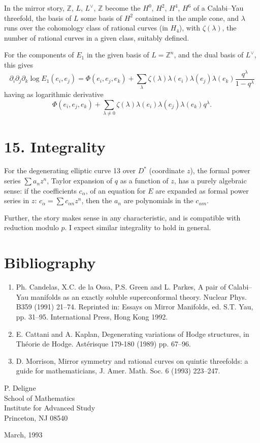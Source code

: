 \documentclass[11pt,a4paper]{article}
\theoremstyle{plain}
\theoremstyle{definition}
\begin{document}
In the mirror story, $\mathbb{Z}$, $L$, $L^{\vee}$, $\mathbb{Z}$ become the $H^{0}$, $H^{2}$, $H^{4}$, $H^{6}$ of a Calabi--Yau threefold, the basis of $L$ some basis of $H^{2}$ contained in the ample cone, and $\lambda$ runs over the cohomology class of rational curves (in $H_{4}$), with $\zeta(\lambda)$, the number of rational curves in a given class, suitably defined.

For the components of $E_{1}$ in the given basis of $L = \mathbb{Z}^{n}$, and the dual basis of $L^{\vee}$, this gives
\[
\partial_{i} \partial_{j} \partial_{k} \log E_{1}(e_{i}, e_{j}) = \Phi(e_{i}, e_{j}, e_{k}) + \sum_{\lambda} \zeta(\lambda) \lambda(e_{i}) \lambda(e_{j}) \lambda(e_{k}) \frac{q^{\lambda}}{1 - q^{\lambda}}
\]
having as logarithmic derivative
\[
\Phi(e_{i}, e_{j}, e_{k}) + \sum_{\lambda \neq 0} \zeta(\lambda) \lambda(e_{i}) \lambda(e_{j}) \lambda(e_{k}) q^{\lambda}.
\]

\section{15. Integrality}

For the degenerating elliptic curve 13 over $D^{*}$ (coordinate $z$), the formal power series $\sum a_{n} z^{n}$, Taylor expansion of $q$ as a function of $z$, has a purely algebraic sense: if the coefficients $c_{\alpha}$, of an equation for $E$ are expanded as formal power series in $z$: $c_{\alpha} = \sum c_{\alpha n} z^{n}$, then the $a_{n}$ are polynomials in the $c_{\alpha m}$.

Further, the story makes sense in any characteristic, and is compatible with reduction modulo $p$. I expect similar integrality to hold in general.

\section*{Bibliography}

\begin{enumerate}
\item[{[1]}] Ph. Candelas, X.C. de la Ossa, P.S. Green and L. Parkes, A pair of Calabi--Yau manifolds as an exactly soluble superconformal theory. Nuclear Phys. B359 (1991) 21--74. Reprinted in: Essays on Mirror Manifolds, ed. S.T. Yau, pp. 31--95. International Press, Hong Kong 1992.
\item[{[2]}] E. Cattani and A. Kaplan, Degenerating variations of Hodge structures, in Th\'eorie de Hodge. Ast\'erisque 179-180 (1989) pp. 67--96.
\item[{[3]}] D. Morrison, Mirror symmetry and rational curves on quintic threefolds: a guide for mathematicians, J. Amer. Math. Soc. 6 (1993) 223--247.
\end{enumerate}

\vspace{1cm}
\noindent
P. Deligne\\
School of Mathematics\\
Institute for Advanced Study\\
Princeton, NJ 08540

\vspace{0.5cm}
\noindent
March, 1993
\end{document}

